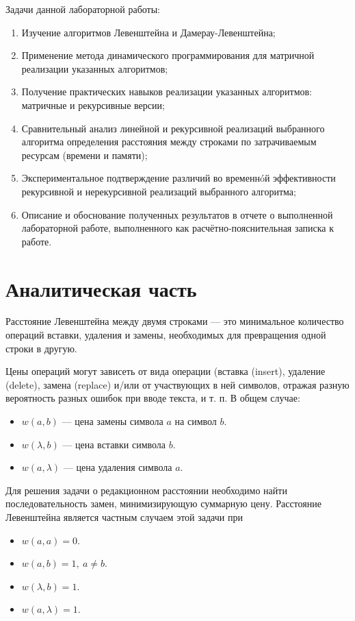 \documentclass[12pt]{report}
\begin{document}
Задачи данной лабораторной работы:
\begin{enumerate}
  	\item Изучение алгоритмов Левенштейна и Дамерау-Левенштейна;
	\item Применение метода динамического программирования для матричной реализации указанных алгоритмов; 
	\item Получение практических навыков реализации указанных алгоритмов: матричные и рекурсивные версии; 
	\item Сравнительный анализ линейной и рекурсивной реализаций выбранного алгоритма определения расстояния между строками по затрачиваемым ресурсам (времени и памяти); 
	\item Экспериментальное подтверждение различий во временнóй эффективности рекурсивной и
нерекурсивной реализаций выбранного алгоритма; 
	\item Описание и обоснование полученных результатов в отчете о выполненной лабораторной
работе, выполненного как расчётно-пояснительная записка к работе. 
\end{enumerate}

\chapter{Аналитическая часть}

Расстояние Левенштейна  между двумя строками — это минимальное количество операций вставки, удаления и замены, необходимых для превращения одной строки в другую.


Цены операций могут зависеть от вида операции (вставка (insert), удаление (delete), замена (replace) и/или от участвующих в ней символов, отражая разную вероятность разных ошибок при вводе текста, и т. п. В общем случае:

\begin{itemize}
	\item $w(a,b)$ — цена замены символа $a$ на символ $b$.
	\item $w(\lambda,b)$ — цена вставки символа $b$.
	\item $w(a,\lambda)$ — цена удаления символа $a$.
\end{itemize}

Для решения задачи о редакционном расстоянии необходимо найти последовательность замен, минимизирующую суммарную цену. Расстояние Левенштейна является частным случаем этой задачи при

\begin{itemize}
	\item $w(a,a)=0$.
	\item $w(a,b)=1, \medspace a \neq b$.
	\item $w(\lambda,b)=1$.
	\item $w(a,\lambda)=1$.
\end{itemize}
\end{document}
